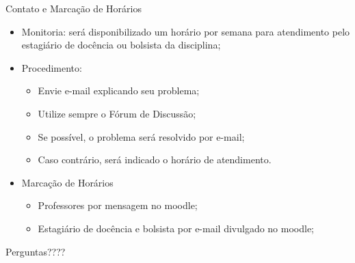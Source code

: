 \documentclass[12pt]{beamer}
\begin{document}
\begin{frame}{Contato e Marcação de Horários}
\begin{itemize}
\item Monitoria: será disponibilizado um horário por semana para atendimento pelo estagiário de docência ou bolsista da disciplina;
\item Procedimento: 
\begin{itemize}
\item Envie e-mail explicando seu problema;
\item Utilize sempre o Fórum de Discussão;
\item Se possível, o problema será resolvido por e-mail;
\item Caso contrário, será indicado o horário de atendimento.
\end{itemize}
\item Marcação de Horários
\begin{itemize}
\item Professores por mensagem no moodle;
\item Estagiário de docência e bolsista por e-mail divulgado no moodle;
\end{itemize}
\end{itemize}
\end{frame}

{
\begin{frame}

{\LARGE Perguntas????}

\end{frame}
}
\end{document}
